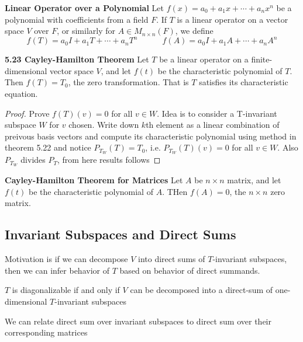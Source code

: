 \documentclass[11pt]{article}
\begin{document}
\begin{defn*}
    \textbf{Linear Operator over a Polynomial} Let $f(x) = a_0 + a_1 x + \cdots + a_n x^n$ be a polynomial with coefficients from a field $F$. If $T$ is a linear operator on a vector space $V$ over $F$, or similarly for $A\in M_{n\times n}(F)$, we define 
    \[
        f(T) = a_0I + a_1 T + \cdots + a_n T^n    
        \quad \quad \quad 
        f(A) = a_0I + a_1 A + \cdots + a_n A^n
    \]
\end{defn*}

\begin{theorem*}
    \textbf{5.23 Cayley-Hamilton Theorem} Let $T$ be a linear operator on a finite-dimensional vector space $V$, and let $f(t)$ be the characteristic polynomial of $T$. Then $f(T) = T_0$, the zero transformation. That is $T$ satisfies its characteristic equation.  
    \begin{proof}
        Prove $f(T)(v)=0$ for all $v\in W$. Idea is to consider a T-invariant subspace $W$ for $v$ chosen. Write down $k$th element as a linear combination of preivous basis vectors and compute its characteristic polynomial using method in theorem 5.22 and notice $P_{T_W}(T) = T_0$, i.e. $P_{T_W}(T)(v) = 0$ for all $v\in W$. Also $P_{T_W}$ divides $P_{T}$, from here results follows
    \end{proof}
\end{theorem*}

\begin{corollary*}
    \textbf{Cayley-Hamilton Theorem for Matrices} Let $A$ be $n\times n$ matrix, and let $f(t)$ be the characteristic polynomial of $A$. THen $f(A) = 0$, the $n\times n$ zero matrix.
\end{corollary*}



\subsection{Invariant Subspaces and Direct Sums}
\begin{rem}
    Motivation is if we can decompose $V$ into direct sums of $T$-invariant subspaces, then we can infer behavior of $T$ based on behavior of direct summands. 
    \item $T$ is diagonalizable if and only if $V$ can be decomposed into a direct-sum of one-dimensional $T$-invariant subspaces
    \item We can relate direct sum over invariant subspaces to direct sum over their corresponding matrices
\end{rem}
\end{document}
